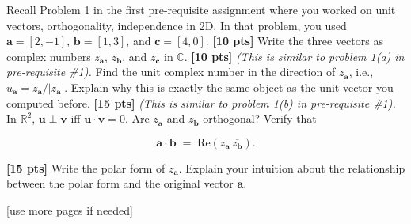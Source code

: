 \documentclass{ee102_pset}
\begin{document}
\newpage
{} Recall Problem 1 in the first pre-requisite assignment where you worked on unit vectors, orthogonality, independence in 2D. In that problem, you used $\mathbf{a}=[2,-1]$, $\mathbf{b}=[1,3]$, and $\mathbf{c}=[4,0]$. 
\problempart \textbf{[10 pts]} Write the three vectors as complex numbers $z_{\mathbf{a}}$, $z_{\mathbf{b}}$, and $z_{\mathbf{c}}$ in $\mathbb{C}$.
\problempart \textbf{[10 pts]} \emph{(This is similar to problem 1(a) in pre-requisite \#1).} Find the unit complex number in the direction of $z_{\mathbf{a}}$, i.e., $u_{\mathbf{a}}=z_{\mathbf{a}}/|z_{\mathbf{a}}|$. Explain why this is exactly the same object as the unit vector you computed before.
\problempart \textbf{[15 pts]} \emph{(This is similar to problem 1(b) in pre-requisite \#1).} In $\mathbb{R}^2$, $\mathbf{u}\perp\mathbf{v}$ iff $\mathbf{u}\cdot\mathbf{v}=0$. Are $z_{\mathbf{a}}$ and $z_{\mathbf{b}}$ orthogonal? Verify that 

\[
\mathbf{a}\cdot\mathbf{b} \;=\; \mathrm{Re}\!\left(z_{\mathbf{a}}\,\overline{z_{\mathbf{b}}}\right).
\]


\problempart \textbf{[15 pts]} Write the polar form of $z_{\mathbf{a}}$. Explain your intuition about the relationship between the polar form and the original vector $\mathbf{a}$.

\vspace*{\fill}
\begin{center}
[use more pages if needed]
\end{center}
\end{document}
